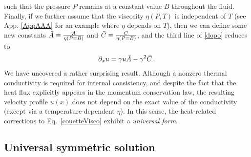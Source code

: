 \documentclass[a4paper, amsfonts, amssymb, amsmath, reprint, showkeys, nofootinbib, twoside,notitlepage,onecolumn]{revtex4-1}
\theoremstyle{definition}
\theoremstyle{theorem}
\begin{document}
such that the pressure $P$ remains at a constant value $B$ throughout the fluid. Finally, if we further assume that  the viscosity $\eta(P,T)$ is independent of $T$ (see App. \ref{AppAAA} for an example where $\eta$ depends on $T$), then we can define some new constants $\Bar{A}\equiv \frac{A}{\eta(P=B)}$ and $\Bar{C}\equiv \frac{C}{\eta(P=B)}$, and the third line of \eqref{dopo} reduces to 
\begin{equation}\label{thepowerful}
\partial_x u =\gamma u \Bar{A} -\gamma^2 \Bar{C}\, .
\end{equation}
We have uncovered a rather surprising result. Although a nonzero thermal conductivity is required for internal consistency, and despite the fact that the heat flux explicitly appears in the momentum conservation law, the resulting velocity profile $u(x)$ does not depend on the exact value of the conductivity (except via a temperature-dependent $\eta$). In this sense, the heat-related corrections to Eq.~\eqref{couetteVisco} exhibit a \textit{universal form}.

\vspace{-0.2cm}
\subsection{Universal symmetric solution}\label{Thelasymmetry}
\vspace{-0.1cm}
\end{document}
